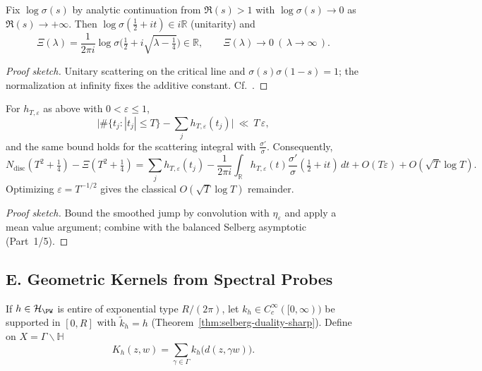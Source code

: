 \begin{lemma}
\label{lem:branch-sharp}
Fix $\log\sigma(s)$ by analytic continuation from $\Re(s)>1$ with $\log\sigma(s)\to 0$ as $\Re(s)\to+\infty$. Then $\log\sigma(\tfrac12+it)\in i\mathbb R$ (unitarity) and
\[
  \Xi(\lambda)=\frac{1}{2\pi i}\log\sigma\!\Big(\tfrac12+i\sqrt{\lambda-\tfrac14}\Big)\in\mathbb R,\qquad \Xi(\lambda)\to 0\ (\,\lambda\to\infty\,).
\]
\end{lemma}

\begin{proof}[Proof sketch]
Unitary scattering on the critical line and $\sigma(s)\sigma(1-s)=1$; the normalization at infinity fixes the additive constant. Cf.\ \cite{LaxPhillips1976,Hejhal1983II}.
\end{proof}

\begin{lemma}
\label{lem:indicator-error-sharp}
For $h_{T,\varepsilon}$ as above with $0<\varepsilon\le 1$,
\[
  \bigg|\#\{t_j:|t_j|\le T\}-\sum_j h_{T,\varepsilon}(t_j)\bigg|\ \ll\ T\,\varepsilon,
\]
and the same bound holds for the scattering integral with $\frac{\sigma'}{\sigma}$. Consequently,
\[
 N_{\mathrm{disc}}(T^2+\tfrac14)-\Xi(T^2+\tfrac14)
 = \sum_j h_{T,\varepsilon}(t_j)-\frac{1}{2\pi i}\int_{\mathbb R}h_{T,\varepsilon}(t)\frac{\sigma'}{\sigma}(\tfrac12+it)\,dt + O(T\varepsilon)+O(\sqrt{T}\log T).
\]
Optimizing $\varepsilon=T^{-1/2}$ gives the classical $O(\sqrt{T}\log T)$ remainder.
\end{lemma}

\begin{proof}[Proof sketch]
Bound the smoothed jump by convolution with $\eta_\varepsilon$ and apply a mean value argument; combine with the balanced Selberg asymptotic (Part~1/5).
\end{proof}


\subsection*{E. Geometric Kernels from Spectral Probes}
\label{subsec:kernels-sharp}

\begin{definition}
If $h\in\mathcal H_{\PW}$ is entire of exponential type $R/(2\pi)$, let $k_h\in C_c^\infty([0,\infty))$ be supported in $[0,R]$ with $\widetilde k_h=h$ (Theorem~\ref{thm:selberg-duality-sharp}). Define on $X=\Gamma\backslash\mathbb H$
\[
  K_h(z,w)=\sum_{\gamma\in\Gamma} k_h\big(d(z,\gamma w)\big).
\]
\end{definition}

